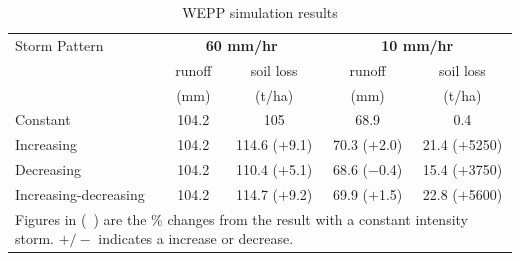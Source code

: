 \begin{table}[htbp]
  \caption{WEPP simulation results}
  \label{tab:WEPPSimulationResults}
  \centering
    \begin{tabular}{lcccc}
      \toprule
      Storm Pattern & \multicolumn{2}{c}{\textbf{60 mm/hr}} &
\multicolumn{2}{c}{\textbf{10 mm/hr}}\\
      \cmidrule(r){2-3} \cmidrule(l){4-5}
      & runoff  & soil loss  & runoff & soil loss\\
      & (mm) & (t/ha) & (mm) & (t/ha)\\
      \midrule
      Constant & 104.2 & 105 & 68.9 & 0.4\\
      Increasing & 104.2 & 114.6 ($+$9.1) & 70.3 ($+$2.0) & 21.4 ($+$5250)\\
      Decreasing & 104.2 & 110.4 ($+$5.1) & 68.6 ($-$0.4) & 15.4 ($+$3750)\\
      Increasing-decreasing & 104.2 & 114.7 ($+$9.2) & 69.9 ($+$1.5) & 22.8
($+$5600)\\
      \bottomrule
      \multicolumn{5}{p{10cm}}{\footnotesize Figures in (\ )
are the \% changes from the result with a constant intensity storm. $+/-$
indicates a increase or decrease.}\\
    \end{tabular}
\end{table}


